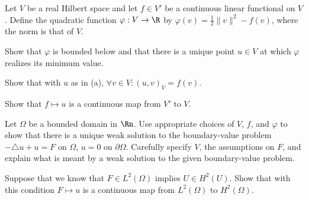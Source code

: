 Let $V$ be a real Hilbert space and let $f\in V'$ be a continuous
linear functional on $V$. Define the quadratic function
$\varphi:V\rightarrow \R$ by $\varphi(v)=\frac{1}{2}\|v\|^2-f(v)$,
where the norm is that of $V$.
\begin{alist} 
\item Show that $\varphi$ is bounded below and that there is
a unique point $u\in V$ at which $\varphi$ realizes its minimum value.
\item Show that with $u$ as in (a), $\forall v\in V: (u,v)_V =f(v)$.
\item Show that $f\mapsto u$ is a continuous map from $V'$ to
$V$.
\item Let $\Omega$ be a bounded domain in $\Rn$. 
Use appropriate choices of $V$, $f$, and $\varphi$ to show that there
is a unique weak solution to the boundary-value problem $-\triangle
u+u=F$ on $\Omega$, $u=0$ on $\partial \Omega$. Carefully specify $V$,
the assumptions on $F$, and explain what is meant by a weak solution
to the given boundary-value problem.
\item Suppose that we know that $F\in L^2(\Omega)$ implies $U\in
H^2(U)$. Show that with this condition $F\mapsto u$ is a continuous
map from $L^2(\Omega)$ to $H^2(\Omega)$.
\end{alist}
